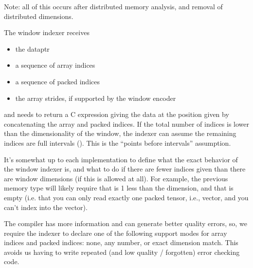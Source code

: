 

\filbreak
Note: all of this occurs after distributed memory analysis, and removal of distributed dimensions.

\filbreak
{}

\filbreak
The window indexer receives
\begin{itemize}
  \item the dataptr
  \filbreak
  \item a sequence of array indices
  \filbreak
  \item a sequence of packed indices
  \filbreak
  \item the array strides, if supported by the window encoder
\end{itemize}

\filbreak
and needs to return a C expression giving the data at the position given by concatenating the array and packed indices.
If the total number of indices is lower than the dimensionality of the window, the indexer can assume the remaining indices are full intervals (\lighttt{:}).
This is the ``points before intervals'' assumption.

\filbreak
It's somewhat up to each  implementation to define what the exact behavior of the window indexer is, and what to do if there are fewer indices given than there are window dimensions (if this is allowed at all).
For example, the previous  memory type will likely require that  is 1 less than the dimension, and that  is empty
(i.e. that you can only read exactly one packed tensor, i.e.,  vector, and you can't index into the vector).

\filbreak
The compiler has more information and can generate better quality errors, so, we require the indexer to declare one of the following support modes for array indices and packed indices: none, any number, or exact dimension match.
This avoids us having to write repeated (and low quality / forgotten) error checking code.

